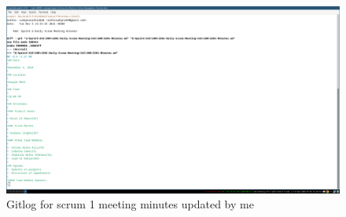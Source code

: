 \documentclass[a4paper,12pt]{article}
\begin{document}
\begin{figure}[H]
    \centering
    \includegraphics[width=1\textwidth]{images/meet13.png}   
    \caption{Gitlog for scrum 1 meeting minutes updated by me}
    \label{fig:meet13}
\end{figure}

\newpage
\end{document}
